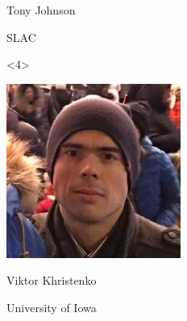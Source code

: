 \documentclass{beamer}
\begin{document}
\begin{frame}{}
\begin{onlyenv}
\begin{minipage}{3 cm}
\begin{center}
{\begin{minipage}{2.3 cm}
\centering Tony Johnson

\centering SLAC
\end{minipage}\hspace{-3.2 cm}}
\end{center}
\end{minipage}\hspace{1 cm}\vspace{3.5 cm}
\end{onlyenv}
\begin{onlyenv}<4>
\vspace{-3.5 cm}\hfill\begin{minipage}{3 cm}
\begin{center}
\includegraphics[width=2 cm]{viktor.jpg}

Viktor Khristenko

{\small University of Iowa}
\end{center}
\end{minipage}\hspace{1 cm}\vspace{3.5 cm}
\end{onlyenv}

\end{frame}
\end{document}
